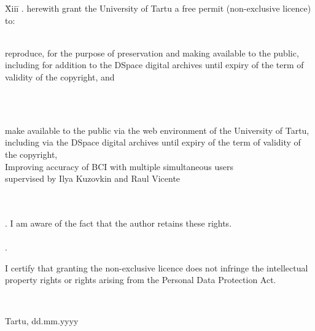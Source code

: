 \documentclass[12pt]{article}
\begin{document}
\begin{tabbing}
\= Xiii\=\kill
{}. \> herewith grant the University of Tartu a free permit (non-exclusive licence) to:\\\\ 

\> 
\begin{minipage}[t]{14.2cm}
reproduce, for the purpose of preservation and making available to the public, including for addition to the DSpace digital archives until expiry of the term of validity of the copyright, and
\end{minipage}
\\\\
\begin{minipage}[t]{14.2cm}
make available to the public via the web environment of the University of Tartu, including via the DSpace digital archives until expiry of the term of validity of the copyright,\\ 

Improving accuracy of BCI with multiple simultaneous users\\   

supervised by Ilya Kuzovkin and Raul Vicente

\end{minipage}\\\\ 
. \>I am aware of the fact that the author retains these rights.\\\\
. \>
\begin{minipage}[t]{14.2cm}
I certify that granting the non-exclusive licence does not infringe the intellectual property rights or rights arising from the Personal Data Protection Act. 
\end{minipage}\\
\end{tabbing}

\noindent
Tartu, dd.mm.yyyy
\end{document}

